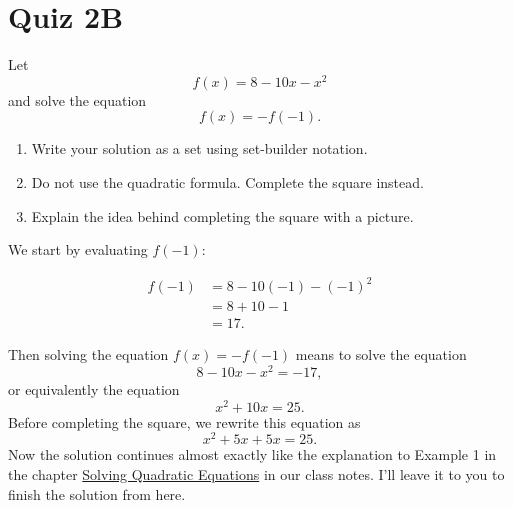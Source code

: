 \documentclass{ximera}
\begin{document}
\section{Quiz 2B}
\begin{question} \label{Qkfkfe3}
 Let 
\[
      f(x) = 8 - 10x - x^2 
\]
and solve the equation
\[
    f(x) = -f(-1) .
\]
\begin{enumerate}

\item Write your solution as a set using set-builder notation.

\item Do not use the quadratic formula. Complete the square instead.

\item Explain the idea behind completing the square with a picture. 

\end{enumerate}

\begin{explanation}
We start by evaluating $f(-1)$:

\begin{align*}
    f(-1)  &= 8 - 10(-1) - (-1)^2  \\
             &= 8 + 10 -1 \\
             &=17.
\end{align*}

Then solving the equation $f(x) = -f(-1)$ means to solve the equation
\[
  8 - 10x - x^2  = -17,
\]
or equivalently the equation
\[
     x^2 + 10x = 25.
\]
Before completing the square, we rewrite this equation as
\[
    x^2 + 5x + 5x = 25.
\]
Now the solution continues almost exactly like the explanation to Example 1 in the chapter \href{https://ximera.osu.edu/precalc1/PreCalculus1/SolvingQuadraticEqs/SolvingQuadraticEqs}{Solving Quadratic Equations} in our class notes. I'll leave it to you to finish the solution from here.
\end{explanation}
\end{question}
\end{document}
